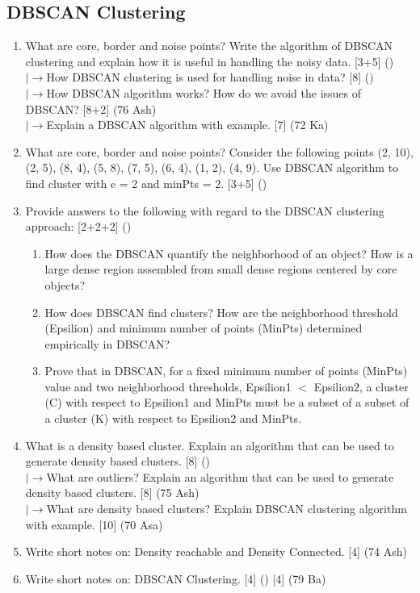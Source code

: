 \documentclass[12pt]{article}
\newcommand{\lb}{\\$\left|\rightarrow\right.$}
\begin{document}
  \subsection{DBSCAN Clustering}
    \begin{enumerate}[topsep=0pt, noitemsep]
      \item What are core, border and noise points? Write the algorithm of DBSCAN clustering and explain how it is useful in handling the noisy data. \hfill [3+5] ()
        \lb How DBSCAN clustering is used for handling noise in data? \hfill [8] ()
        \lb How DBSCAN algorithm works? How do we avoid the issues of DBSCAN? \hfill [8+2] (76 Ash)
        \lb Explain a DBSCAN algorithm with example. \hfill [7] (72 Ka)

      \item What are core, border and noise points? Consider the following points (2, 10), (2, 5), (8, 4), (5, 8), (7, 5), (6, 4), (1, 2), (4, 9). Use DBSCAN algorithm to find cluster with e = 2 and minPts = 2. \hfill [3+5] ()

      \item Provide answers to the following with regard to the DBSCAN clustering approach: \hfill [2+2+2] ()
        \begin{enumerate}[label=\alph*),topsep=2pt,noitemsep]
          \item How does the DBSCAN quantify the neighborhood of an object? How is a large dense region assembled from small dense regions centered by core objects?
          \item How does DBSCAN find clusters? How are the neighborhood threshold (Epsilion) and minimum number of points (MinPts) determined empirically in DBSCAN?
          \item Prove that in DBSCAN, for a fixed minimum number of points (MinPts) value and two neighborhood thresholds, Epsilion1 $<$ Epsilion2, a cluster (C) with respect to Epsilion1 and MinPts must be a subset of a subset of a cluster (K) with respect to Epsilion2 and MinPts.
        \end{enumerate}

      \item What is a density based cluster. Explain an algorithm that can be used to generate density based clusters. \hfill [8] ()
        \lb What are outliers? Explain an algorithm that can be used to generate density based clusters. \hfill [8] (75 Ash)
        \lb What are density based clusters? Explain DBSCAN clustering algorithm with example. \hfill [10] (70 Asa)

      \item Write short notes on: Density reachable and Density Connected. \hfill [4] (74 Ash)

      \item Write short notes on: DBSCAN Clustering. \hfill [4] () [4] (79 Ba)
    \end{enumerate}
\end{document}
